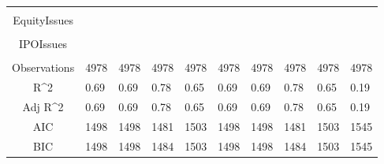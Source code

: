 \documentclass{article}
\begin{document}
\begin{table}[H]
\begin{tabular}{|clllllllll|}
   &  &  &  &  &  &  &  &  &  \\ 
  EquityIssues &  &  &  &  &  &  &  &  &  \\ 
   &  &  &  &  &  &  &  &  &  \\ 
  IPOIssues &  &  &  &  &  &  &  &  &  \\ 
   &  &  &  &  &  &  &  &  &  \\ 
  \hline 
 Observations & 4978 & 4978 & 4978 & 4978 & 4978 & 4978 & 4978 & 4978 & 4978 \\ 
  R^2 & 0.69 & 0.69 & 0.78 & 0.65 & 0.69 & 0.69 & 0.78 & 0.65 & 0.19 \\ 
  Adj R^2 & 0.69 & 0.69 & 0.78 & 0.65 & 0.69 & 0.69 & 0.78 & 0.65 & 0.19 \\ 
  AIC & 1498 & 1498 & 1481 & 1503 & 1498 & 1498 & 1481 & 1503 & 1545 \\ 
  BIC & 1498 & 1498 & 1484 & 1503 & 1498 & 1498 & 1484 & 1503 & 1545 \\ 
   \hline
\end{tabular}
 
\end{table}
\end{document}
